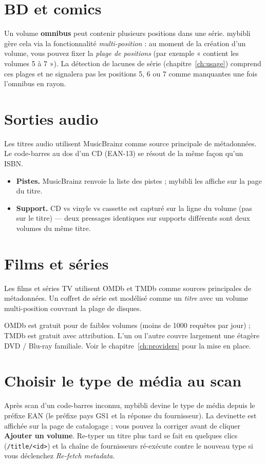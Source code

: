 \section{BD et comics}

Un volume \textbf{omnibus} peut contenir plusieurs
positions dans une série. mybibli gère cela via la fonctionnalité
\emph{multi-position} : au moment de la
création d'un volume, vous pouvez fixer la \emph{plage de
positions} (par exemple « contient les volumes 5 à 7 »). La
détection de lacunes de série (chapitre~\ref{ch:usage}) comprend ces
plages et ne signalera pas les positions 5, 6 ou 7 comme manquantes
une fois l'omnibus en rayon.

\section{Sorties audio}

Les titres audio utilisent MusicBrainz comme
source principale de métadonnées. Le code-barres au dos d'un CD
(EAN-13) se résout de la même façon qu'un ISBN.

\begin{itemize}
  \item \textbf{Pistes.} MusicBrainz renvoie la liste des pistes ;
        mybibli les affiche sur la page du titre.
  \item \textbf{Support.} CD vs vinyle vs cassette est capturé sur
        la ligne du volume (pas sur le titre) — deux pressages
        identiques sur supports différents sont deux volumes du
        même titre.
\end{itemize}

\section{Films et séries}

Les films et séries TV utilisent OMDb et
TMDb comme sources principales de métadonnées. Un
coffret de série est modélisé comme un \emph{titre} avec un volume
multi-position couvrant la plage de disques.

\begin{tip}
OMDb est gratuit pour de faibles volumes (moins de 1000 requêtes
par jour) ; TMDb est gratuit avec attribution. L'un ou l'autre
couvre largement une étagère DVD / Blu-ray familiale. Voir le
chapitre~\ref{ch:providers} pour la mise en place.
\end{tip}

\section{Choisir le type de média au scan}

Après scan d'un code-barres inconnu, mybibli devine le type de
média depuis le préfixe EAN (le préfixe pays GS1 et la réponse du
fournisseur). La devinette est affichée sur la page de catalogage ;
vous pouvez la corriger avant de cliquer \textbf{Ajouter un volume}.
Re-typer un titre plus tard se fait en quelques clics
(\texttt{/title/<id>}) et la chaîne de fournisseurs ré-exécute
contre le nouveau type si vous déclenchez \emph{Re-fetch
metadata}.
